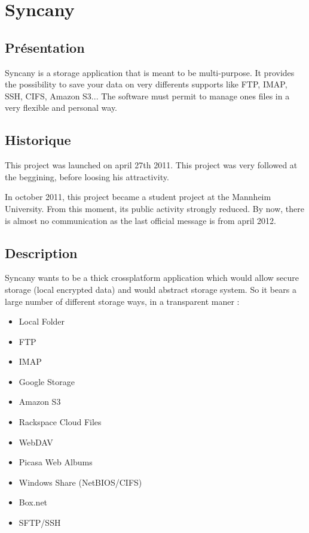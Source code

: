 \section{Syncany}
\thispagestyle{EIP}
\subsection{Présentation}
Syncany is a storage application that is meant to be multi-purpose. It provides the possibility to save your data on very differents supports like FTP, IMAP, SSH, CIFS, Amazon S3... The software must permit to manage ones files in a very flexible and personal way.

\subsection{Historique}
This project was launched on april 27th 2011. This project was very followed at the beggining, before loosing his attractivity.

In october 2011, this project became a student project at the Mannheim University. From this moment, its public activity strongly reduced. By now, there is almost no communication as the last official message is from april 2012.

\subsection{Description}
Syncany wants to be a thick crossplatform application which would allow secure storage (local encrypted data) and would abstract storage system. So it bears a large number of different storage ways, in a transparent maner :

\begin{itemize}
\renewcommand{\labelitemi}{$\bullet$}
\item Local Folder
\item FTP
\item IMAP
\item Google Storage
\item Amazon S3
\item Rackspace Cloud Files
\item WebDAV
\item Picasa Web Albums
\item Windows Share (NetBIOS/CIFS)
\item Box.net
\item SFTP/SSH
\end{itemize}

\vspace{1cm}

